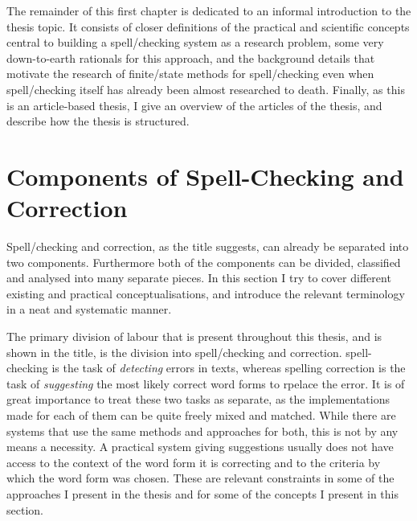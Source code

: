\documentclass[officiallayout,final]{unihelcompling}
\begin{document}
The remainder of this first chapter is dedicated to an informal introduction to
the thesis topic. It consists of closer definitions of the practical and
scientific concepts central to building a spell\-/checking system as a research
problem, some very down-to-earth rationals for this approach, and the
background details that motivate the research of finite\-/state methods for
spell\-/checking even when spell\-/checking itself has already been almost
researched to death. Finally, as this is an article-based thesis, I give an
overview of the articles of the thesis, and describe how the thesis is
structured.

\section{Components of Spell-Checking and Correction}
\label{sec:practical-components}

Spell\-/checking and correction, as the title suggests, can already be
separated into two components. Furthermore both of the components can be
divided, classified and analysed into many separate pieces. In this section I
try to cover different existing and practical conceptualisations, and introduce
the relevant terminology in a neat and systematic manner.

The primary division of labour that is present throughout this thesis, and is shown
in the title, is the division into spell\-/checking and correction.
\Gls{spell-checking} is the task of \emph{detecting} errors in texts,
whereas \gls{spelling correction} is the task of \emph{suggesting} the most
likely correct \glspl{word form} to rpelace the error. It is of great
importance to treat these two tasks as separate, as the implementations made
for each of them can be quite freely mixed and matched.  While there are
systems that use the same methods and approaches for both, this is not by any
means a necessity. A practical system giving suggestions usually does not have
access to the context of the word form it is correcting and to the criteria by
which the word form was chosen. These are relevant constraints in some of the
approaches I present in the thesis and for some of the concepts I present in
this section.
\end{document}
